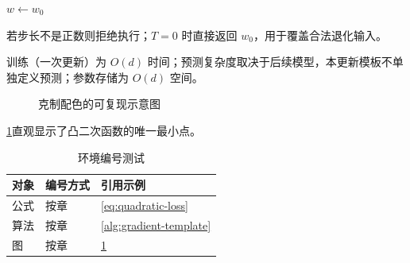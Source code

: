 \documentclass[UTF8,a4paper,11pt,openany]{ctexbook}
\begin{document}
\begin{algorithm}[H]
$w\leftarrow w_0$\;
\;
\caption{梯度下降模板}\label{alg:gradient-template}
\end{algorithm}
\begin{warningbox}
若步长不是正数则拒绝执行；$T=0$ 时直接返回 $w_0$，用于覆盖合法退化输入。
\end{warningbox}
\begin{complexitybox}
训练（一次更新）为 $O(d)$ 时间；预测复杂度取决于后续模型，本更新模板不单独定义预测；参数存储为 $O(d)$ 空间。
\end{complexitybox}

\begin{figure}[H]
\centering
{}
\caption{克制配色的可复现示意图}\label{fig:template-curve}
\end{figure}
\cref{fig:template-curve}直观显示了凸二次函数的唯一最小点。

\begin{table}[H]
\centering
\caption{环境编号测试}\label{tab:template-environments}
\begin{tabular}{lll}
\toprule
对象 & 编号方式 & 引用示例\\
\midrule
公式 & 按章 & \cref{eq:quadratic-loss}\\
算法 & 按章 & \cref{alg:gradient-template}\\
图 & 按章 & \cref{fig:template-curve}\\
\bottomrule
\end{tabular}
\end{table}
\end{document}
